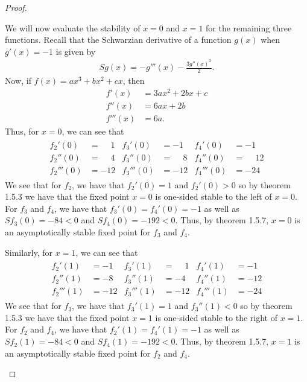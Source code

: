 \begin{proof}
\begin{enumerate}
      We will now evaluate the stability of $x=0$ and $x=1$ for the remaining three functions.
      Recall that the Schwarzian derivative of a function $g(x)$ when $g'(x)=-1$ is given by
      \begin{align*}
        Sg(x) = -g'''(x) - \frac{3g''(x)^2}{2}.
      \end{align*}
      Now, if $f(x) = ax^3 + bx^2 + cx$, then
      \begin{align*}
        f'(x) &= 3ax^2 + 2bx + c\\
        f''(x) &= 6ax + 2b \\
        f'''(x) &= 6a.
      \end{align*}
      Thus, for $x =0$, we can see that
      \begin{align*}
        \begin{array}{rlrlrl}
          f_2'(0) &= \phantom{-}1  & f_3'(0) &= -1            & f_4'(0) &= -1 \\
          f_2''(0) &= \phantom{-}4 & f_3''(0) &= \phantom{-}8 & f_4''(0) &= \phantom{-}12 \\
          f_2'''(0) &= -12         & f_3'''(0) &= -12         & f_4'''(0) &= -24
        \end{array}
      \end{align*}
      We see that for $f_2$, we have that $f_2'(0) = 1$ and $f_2'(0) > 0$ so
      by theorem 1.5.3 we have that the fixed point $x=0$ is one-sided stable to the left of $x=0$.
      For $f_3$ and $f_4$, we have that $f_3'(0) = f_4'(0) = -1$ as well as $Sf_3(0) = -84 < 0$
      and $Sf_4(0) = -192 < 0$. Thus, by theorem 1.5.7, $x=0$
      is an asymptotically stable fixed point for $f_3$ and $f_4$.

      Similarly, for $x=1$, we can see that
      \begin{align*}
        \begin{array}{rlrlrl}
          f_2'(1) &= -1    & f_3'(1) &= \phantom{-}1  & f_4'(1) &= -1 \\
          f_2''(1) &= -8   & f_3''(1) &= -4           & f_4''(1) &= -12 \\
          f_2'''(1) &= -12 & f_3'''(1) &= -12         & f_4'''(1) &= -24
        \end{array}
      \end{align*}
      We see that for $f_3$, we have that $f_3'(1) = 1$ and $f_3''(1) < 0$ so
      by theorem 1.5.3 we have that the fixed point $x=1$ is one-sided stable to the right of $x=1$.
      For $f_2$ and $f_4$, we have that $f_2'(1) = f_4'(1) = -1$ as well as $Sf_2(1) = -84 < 0$
      and $Sf_4(1) = -192 < 0$. Thus, by theorem 1.5.7, $x=1$
      is an asymptotically stable fixed point for $f_2$ and $f_4$.
  \end{enumerate}
\end{proof}
\newpage
